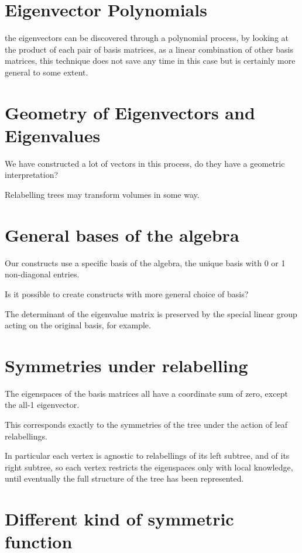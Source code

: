 \documentclass[10pt,a4paper]{report}
\begin{document}
\section{Eigenvector Polynomials}

the eigenvectors can be discovered through a polynomial process, by looking at
the product of each pair of basis matrices, as a linear combination of other
basis matrices, this technique does not save any time in this case but is
certainly more general to some extent.

\section{Geometry of Eigenvectors and Eigenvalues}

We have constructed a lot of vectors in this process, do they have a geometric
interpretation?

Relabelling trees may transform volumes in some way.

\section{General bases of the algebra}

Our constructs use a specific basis of the algebra, the unique basis with 0 or
1 non-diagonal entries.

Is it possible to create constructs with more general choice of basis?

The determinant of the eigenvalue matrix is preserved by the special linear
group acting on the original basis, for example.

\section{Symmetries under relabelling}

The eigenspaces of the basis matrices all have a coordinate sum of zero, except
the all-1 eigenvector.

This corresponds exactly to the symmetries of the tree under the action of leaf
relabellings.

In particular each vertex is agnostic to relabellings of its left subtree, and
of its right subtree, so each vertex restricts the eigenspaces only with local
knowledge, until eventually the full structure of the tree has been
represented.

\section{Different kind of symmetric function}
\end{document}
